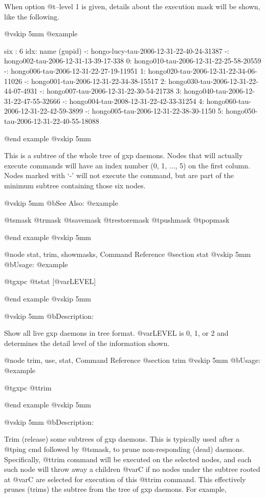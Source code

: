 When option @t{--level} 1 is given, details about the execution mask
will be shown, like the following.

@vskip 5mm
@example

  six : 6
   idx: name (gupid)
     -: hongo-lucy-tau-2006-12-31-22-40-24-31387
     -:  hongo002-tau-2006-12-31-13-39-17-338
     0:   hongo010-tau-2006-12-31-22-25-58-20559
     -:  hongo006-tau-2006-12-31-22-27-19-11951
     1:   hongo020-tau-2006-12-31-22-34-06-11026
     -:  hongo001-tau-2006-12-31-22-34-38-15517
     2:   hongo030-tau-2006-12-31-22-44-07-4931
     -:  hongo007-tau-2006-12-31-22-30-54-21738
     3:   hongo040-tau-2006-12-31-22-47-55-32666
     -:  hongo004-tau-2008-12-31-22-42-33-31254
     4:   hongo060-tau-2006-12-31-22-42-59-3899
     -:  hongo005-tau-2006-12-31-22-38-30-1150
     5:   hongo050-tau-2006-12-31-22-40-55-18088

@end example
@vskip 5mm

This is a subtree of the whole tree of gxp daemons.  Nodes that will
actually execute commands will have an index number (0, 1, ..., 5) on
the first column. Nodes marked with `-' will not execute the
command, but are part of the minimum subtree containing those six
nodes.

@vskip 5mm
@b{See Also:}
@example

  @t{smask} @t{rmask} @t{savemask} @t{restoremask} @t{pushmask} @t{popmask}

@end example
@vskip 5mm

@node stat, trim, showmasks, Command Reference
@section stat
@vskip 5mm
@b{Usage:}
@example

  @t{gxpc} @t{stat} [@var{LEVEL}]

@end example
@vskip 5mm

@vskip 5mm
@b{Description:}


  Show all live gxp daemons in tree format. @var{LEVEL} is 0, 1, or 2 and
determines the detail level of the information shown.

@node trim, use, stat, Command Reference
@section trim
@vskip 5mm
@b{Usage:}
@example

  @t{gxpc} @t{trim}

@end example
@vskip 5mm

@vskip 5mm
@b{Description:}


  Trim (release) some subtrees of gxp daemons. This is typically
used after a @t{ping} cmd followed by @t{smask}, to prune non-responding
(dead) daemons.  Specifically, @t{trim} command will be executed on
the selected nodes, and each such node will throw away a children
@var{C} if no nodes under the subtree rooted at @var{C} are selected for
execution of this @t{trim} command. This effectively prunes (trims)
the subtree from the tree of gxp daemons. For example,

